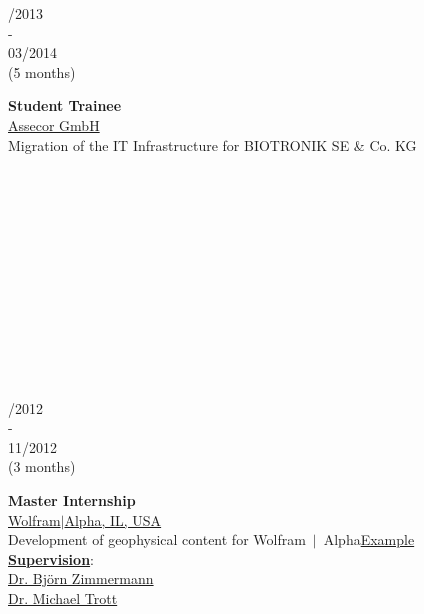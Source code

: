 \documentclass{article}
\begin{document}
\begin{minipage}[t]{0.69\textwidth}
\begin{minipage}{0.49\textwidth}
		\vspace{0.5cm}
		
		\begin{minipage}[t]{0.25\textwidth}
		/2013\\ -\\ 03/2014 \\(5 months)
		\end{minipage}
		\hfill
		\begin{minipage}[t]{0.75\textwidth}
		\textbf{Student Trainee}\\
		\href{https://assecor.de/}{\color{pblue}Assecor GmbH}\\
	     Migration of the IT Infrastructure for BIOTRONIK SE \& Co. KG
		\end{minipage}
		\\\\\\\\\\\\\\\\\\\\\
		\end{minipage}	
		\hfill
		\vrule	
		\hfill
		\begin{minipage}{0.49\textwidth}
		\begin{minipage}[t]{0.25\textwidth}
		/2012\\ -\\ 11/2012 \\(3 months)
		\end{minipage}		
		\hfill
		\begin{minipage}[t]{0.75\textwidth}
		\textbf{Master Internship}\\
		\href{https:///www.wolframalpha.com/}{\color{pblue}Wolfram$\mid$Alpha, IL, USA}\\
	   Development of geophysical content for Wolfram$~\mid~$Alpha\hfill \href{https://m.wolframalpha.com/input/?i=moment+magnitude}{\color{pblue}Example}\\
	    \textbf{\underline{Supervision}}:\\ \href{mailto:bjornz@wolfram.com }{Dr. Björn Zimmermann} \\ \href{mailto:mtrott@wolfram.com }{Dr. Michael Trott} 
		\end{minipage}
		

\end{minipage}
\end{minipage}
\end{document}
